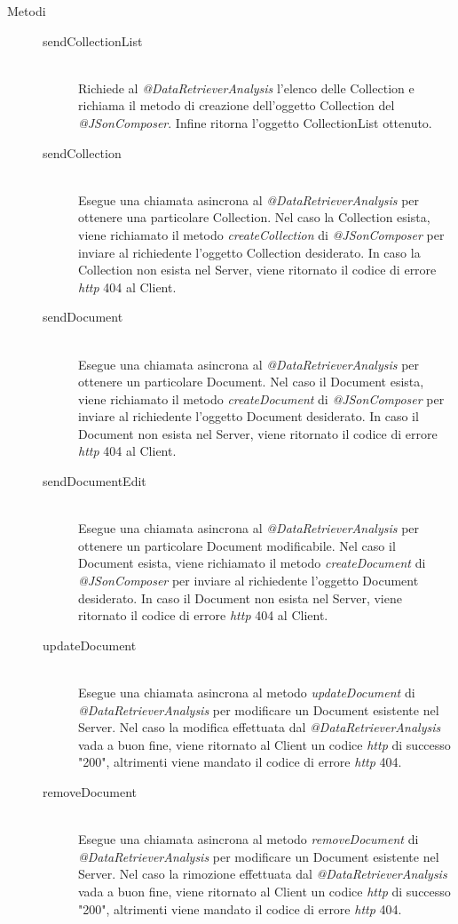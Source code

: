 \begin{description}
 \item[Metodi] \hfill
 \begin{description}
 \item[sendCollectionList] \hfill \\
 Richiede al \textit{@DataRetrieverAnalysis} l'elenco delle Collection e richiama il metodo di creazione dell'oggetto Collection del \textit{@JSonComposer}. Infine ritorna l'oggetto CollectionList ottenuto.
 \item[sendCollection] \hfill \\
 Esegue una chiamata asincrona al \textit{@DataRetrieverAnalysis} per ottenere una particolare Collection. Nel caso la Collection esista, viene richiamato il metodo \textit{createCollection} di \textit{@JSonComposer} per inviare al richiedente l'oggetto Collection desiderato. In caso la Collection non esista nel Server, viene ritornato il codice di errore \textit{http} 404 al Client.
 \item[sendDocument] \hfill \\
 Esegue una chiamata asincrona al \textit{@DataRetrieverAnalysis} per ottenere un particolare Document. Nel caso il Document esista, viene richiamato il metodo \textit{createDocument} di \textit{@JSonComposer} per inviare al richiedente l'oggetto Document desiderato. In caso il Document non esista nel Server, viene ritornato il codice di errore \textit{http} 404 al Client.
 \item[sendDocumentEdit] \hfill \\
 Esegue una chiamata asincrona al \textit{@DataRetrieverAnalysis} per ottenere un particolare Document modificabile. Nel caso il Document esista, viene richiamato il metodo \textit{createDocument} di \textit{@JSonComposer} per inviare al richiedente l'oggetto Document desiderato. In caso il Document non esista nel Server, viene ritornato il codice di errore \textit{http} 404 al Client.
 \item[updateDocument] \hfill \\
 Esegue una chiamata asincrona al metodo \textit{updateDocument} di \textit{@DataRetrieverAnalysis} per modificare un Document esistente nel Server. Nel caso la modifica effettuata dal \textit{@DataRetrieverAnalysis} vada a buon fine, viene ritornato al Client un codice \textit{http} di successo "200", altrimenti viene mandato il codice di errore \textit{http} 404.
 \item[removeDocument] \hfill \\
 Esegue una chiamata asincrona al metodo \textit{removeDocument} di \textit{@DataRetrieverAnalysis} per modificare un Document esistente nel Server. Nel caso la rimozione effettuata dal \textit{@DataRetrieverAnalysis} vada a buon fine, viene ritornato al Client un codice \textit{http} di successo "200", altrimenti viene mandato il codice di errore \textit{http} 404.
 \end{description}
 
\end{description}



